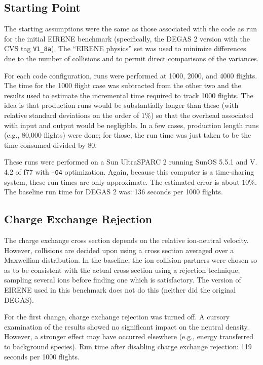 \documentclass[12pt]{report}
\begin{document}
\subsection{Starting Point}

The starting assumptions were the same as those associated with the
code as run for the initial EIRENE benchmark (specifically, the 
DEGAS 2 version with the CVS tag \verb+V1_8a+).
The ``EIRENE physics'' set was used to minimize differences due to the 
number of collisions and to permit direct comparisons of the variances.

For each code configuration, runs were performed at 1000, 2000, and
4000 flights. The time for the 1000 flight case was subtracted from
the other two and the results used to estimate the incremental
time required to track 1000 flights. The idea is that production
runs would be substantially longer than these (with relative standard
deviations on the order of $1 \%$) so that the overhead associated with
input and output would be negligible. In a few cases, production length
runs (e.g., 80,000 flights) were done; for those, the run time was just
taken to be the time consumed divided by 80. 

These runs were performed on a Sun UltraSPARC 2 running SunOS 5.5.1
and V. 4.2 of f77 with \verb+-O4+ optimization. Again, because this computer 
is a time-sharing system, these run times are only approximate. The 
estimated error is about $10 \%$. The baseline run time for
DEGAS 2 was: 136 seconds per 1000 flights.

\subsection{Charge Exchange Rejection}

The charge exchange cross section depends on the relative ion-neutral
velocity. However, collisions are decided upon using a cross section
averaged over a Maxwellian distribution. In the baseline, the ion
collision partners were chosen so as to be consistent with the actual
cross section using a rejection technique, sampling several ions 
before finding one which is satisfactory.
The version of EIRENE used in this benchmark does not do this 
(neither did the original DEGAS). 

For the
first change, charge exchange rejection was turned off. A cursory
examination of the results showed no significant impact on the neutral
density. However, a stronger effect may have occurred elsewhere (e.g.,
energy transferred to background species). Run time after disabling
charge exchange rejection: 119 seconds per 1000 flights.
\end{document}
